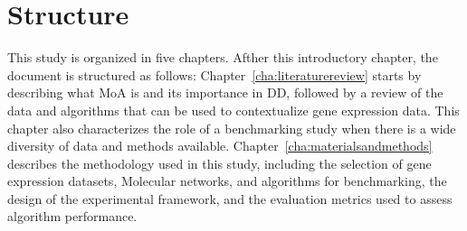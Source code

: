 \section{Structure} %
\label{sec:structure}

This study is organized in five chapters.
Afther this introductory chapter, the document is structured as follows: Chapter~\ref{cha:literaturereview} starts by describing what \gls{MoA} is and its importance in \gls{DD}, followed by a review of the data and algorithms that can be used to contextualize gene expression data. This chapter also characterizes the role of a benchmarking study when there is a wide diversity of data and methods available. 
Chapter~\ref{cha:materialsandmethods} describes the methodology used in this study, including the selection of gene expression datasets, \gls{Molecular network}s, and algorithms for benchmarking, the design of the experimental framework, and the evaluation metrics used to assess algorithm performance.
